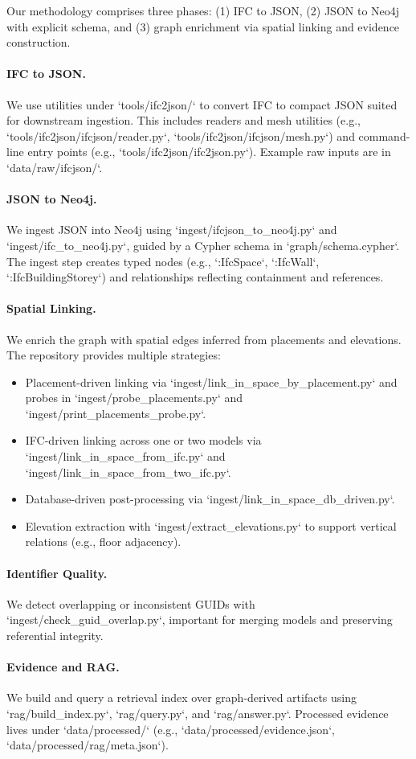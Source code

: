 Our methodology comprises three phases: (1) IFC to JSON, (2) JSON to Neo4j with explicit schema, and (3) graph enrichment via spatial linking and evidence construction.

\paragraph{IFC to JSON.} We use utilities under `tools/ifc2json/` to convert IFC to compact JSON suited for downstream ingestion. This includes readers and mesh utilities (e.g., `tools/ifc2json/ifcjson/reader.py`, `tools/ifc2json/ifcjson/mesh.py`) and command-line entry points (e.g., `tools/ifc2json/ifc2json.py`). Example raw inputs are in `data/raw/ifcjson/`.

\paragraph{JSON to Neo4j.} We ingest JSON into Neo4j using `ingest/ifcjson_to_neo4j.py` and `ingest/ifc_to_neo4j.py`, guided by a Cypher schema in `graph/schema.cypher`. The ingest step creates typed nodes (e.g., `:IfcSpace`, `:IfcWall`, `:IfcBuildingStorey`) and relationships reflecting containment and references.

\paragraph{Spatial Linking.} We enrich the graph with spatial edges inferred from placements and elevations. The repository provides multiple strategies:
\begin{itemize}[leftmargin=*]
  \item Placement-driven linking via `ingest/link_in_space_by_placement.py` and probes in `ingest/probe_placements.py` and `ingest/print_placements_probe.py`.
  \item IFC-driven linking across one or two models via `ingest/link_in_space_from_ifc.py` and `ingest/link_in_space_from_two_ifc.py`.
  \item Database-driven post-processing via `ingest/link_in_space_db_driven.py`.
  \item Elevation extraction with `ingest/extract_elevations.py` to support vertical relations (e.g., floor adjacency).
\end{itemize}

\paragraph{Identifier Quality.} We detect overlapping or inconsistent GUIDs with `ingest/check_guid_overlap.py`, important for merging models and preserving referential integrity.

\paragraph{Evidence and RAG.} We build and query a retrieval index over graph-derived artifacts using `rag/build_index.py`, `rag/query.py`, and `rag/answer.py`. Processed evidence lives under `data/processed/` (e.g., `data/processed/evidence.json`, `data/processed/rag/meta.json`).

